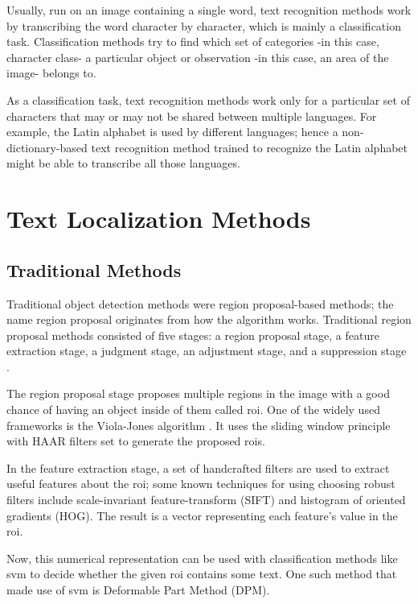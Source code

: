 Usually, run on an image containing a single word, text recognition methods work by transcribing the word character by character, which is mainly a classification task.
Classification methods try to find which set of categories -in this case, character class- a particular object or observation -in this case, an area of the image- belongs to.

As a classification task, text recognition methods work only for a particular set of characters that may or may not be shared between multiple languages. For example, the Latin alphabet is used by different languages; hence a non-dictionary-based text recognition method trained to recognize the Latin alphabet might be able to transcribe all those languages.

\section{Text Localization Methods}
\subsection{Traditional Methods}
Traditional object detection methods were region proposal-based methods; the name region proposal originates from how the algorithm works.
Traditional region proposal methods consisted of five stages: a region proposal stage, a feature extraction stage, a judgment stage, an adjustment stage, and a suppression stage \cite{wang_object_2021}.

The region proposal stage proposes multiple regions in the image with a good chance of having an object inside of them called \gls{roi}. One of the widely used frameworks is the Viola-Jones algorithm \cite{viola_rapid_2001}. It uses the sliding window principle with HAAR filters set to generate the proposed \gls{roi}s.

In the feature extraction stage, a set of handcrafted filters are used to extract useful features about the \gls{roi}; some known techniques for using choosing robust filters include scale-invariant feature-transform (SIFT) \cite{lowe_object_1999} and histogram of oriented gradients (HOG)\cite{dalal_histograms_2005}. The result is a vector representing each feature's value in the \gls{roi}.

Now, this numerical representation can be used with classification methods like \gls{svm} to decide whether the given \gls{roi} contains some text. One such method that made use of \gls{svm} is Deformable Part Method 
(DPM)\cite{felzenszwalb_object_nodate}.

